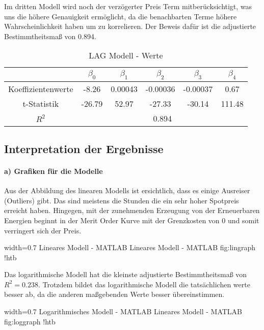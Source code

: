 \documentclass{eegreport}
\begin{document}
Im dritten Modell wird noch der verzögerter Preis Term mitberücksichtigt, was uns die höhere Genauigkeit ermöglicht, da die benachbarten Terme höhere Wahrscheinlichkeit haben um zu korrelieren. Der Beweis dafür ist die adjustierte Bestimmtheitsmaß von 0.894.
\begin{table}[h]
\begin{center}
\begin{tabular}{|c|c|c|c|c|c|}
\hline 
 & $\beta_0$ & $\beta_1$ & $\beta_2$ & $\beta_3$ & $\beta_4$ \\ 
\hline 
Koeffizientenwerte & -8.26 & 0.00043 & -0.00036 & -0.00037 & 0.67 \\ 
\hline 
t-Statistik & -26.79 & 52.97 & -27.33 & -30.14 & 111.48 \\ 
\hline 
$R^{2}$ & \multicolumn{5}{c|}{0.894} \\ 
\hline 
\end{tabular} 
\end{center}
\caption{LAG Modell - Werte}
\label{lag1}
\end{table}


\subsection{Interpretation der Ergebnisse}

\paragraph{a) Grafiken für die Modelle} \mbox{} \newline\newline
Aus der Abbildung des linearen Modells ist ersichtlich, dass es einige Ausreiser (Outliers) gibt. Das sind meistens die Stunden die ein sehr hoher Spotpreis erreicht haben. Hingegen, mit der zunehmenden Erzeugung von der Erneuerbaren Energien beginnt in der Merit Order Kurve mit der Grenzkosten von 0 und somit verringert sich der Preis.

{width=0.7\linewidth}
{Lineares Modell - MATLAB}
{Lineares Modell - MATLAB}
{fig:lingraph}
{!htb}

Das logarithmische Modell hat die kleinste adjustierte Bestimmtheitsmaß von $R^2 = 0.238$. Trotzdem bildet das logarithmische Modell die tatsächlichen werte besser ab, da die anderen maßgebenden Werte besser übereinstimmen.

{width=0.7\linewidth}
{Logarithmisches Modell - MATLAB}
{Lineares Modell - MATLAB}
{fig:loggraph}
{!htb}
\end{document}
